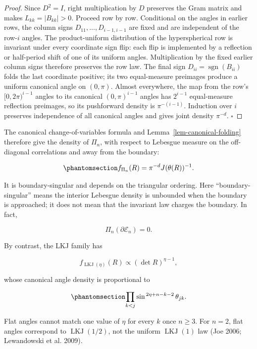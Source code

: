 \documentclass[
  english,
  11pt,
  letterpaper,
  DIV=11,
  numbers=noendperiod]{scrartcl}
\theoremstyle{plain}
\theoremstyle{plain}
\theoremstyle{plain}
\theoremstyle{plain}
\theoremstyle{remark}
\begin{document}
\begin{proof}
Since \(D^2=I\), right multiplication by \(D\) preserves the Gram matrix
and makes \(L_{kk}=|B_{kk}|>0\). Proceed row by row. Conditional on the
angles in earlier rows, the column signs \(D_{11},\ldots,D_{i-1,i-1}\)
are fixed and are independent of the row-\(i\) angles. The
product-uniform distribution of the hyperspherical row is invariant
under every coordinate sign flip: each flip is implemented by a
reflection or half-period shift of one of its uniform angles.
Multiplication by the fixed earlier column signs therefore preserves the
row law. The final sign \(D_{ii}=\operatorname{sgn}(B_{ii})\) folds the
last coordinate positive; its two equal-measure preimages produce a
uniform canonical angle on \((0,\pi)\). Almost everywhere, the map from
the row's \([0,2\pi)^{i-1}\) angles to its canonical \((0,\pi)^{i-1}\)
angles has \(2^{i-1}\) equal-measure reflection preimages, so its
pushforward density is \(\pi^{-(i-1)}\). Induction over \(i\) preserves
independence of all canonical angles and gives joint density
\(\pi^{-d}\). \(\square\)
\end{proof}

The canonical change-of-variables formula and
Lemma~\ref{lem-canonical-folding} therefore give the density of
\(\Pi_n\), with respect to Lebesgue measure on the off-diagonal
correlations and away from the boundary:

\begin{equation}\protect\phantomsection\label{eq-flat-angle-density}{
f_{\Pi_n}(R)
=\pi^{-d}J(\theta(R))^{-1}.
}\end{equation}

It is boundary-singular and depends on the triangular ordering. Here
``boundary-singular'' means the interior Lebesgue density is unbounded
when the boundary is approached; it does not mean that the invariant law
charges the boundary. In fact,

\[
\Pi_n(\partial\mathcal E_n)=0.
\]

By contrast, the LKJ family has

\[
f_{\operatorname{LKJ}(\eta)}(R)
\propto(\det R)^{\eta-1},
\]

whose canonical angle density is proportional to

\begin{equation}\protect\phantomsection\label{eq-lkj-angle-density}{
\prod_{k<j}
\sin^{\,2\eta+n-k-2}\theta_{jk}.
}\end{equation}

Flat angles cannot match one value of \(\eta\) for every \(k\) once
\(n\ge3\). For \(n=2\), flat angles correspond to
\(\operatorname{LKJ}(1/2)\), not the uniform \(\operatorname{LKJ}(1)\)
law (Joe 2006; Lewandowski et al. 2009).
\end{document}
